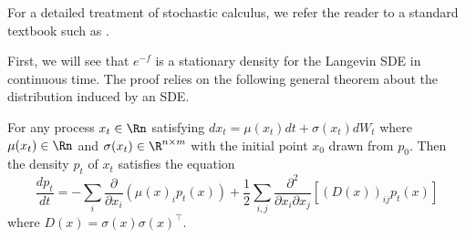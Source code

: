 For a detailed treatment of stochastic calculus, we refer the reader
to a standard textbook such as \cite{oksendal2013stochastic}. 

First, we will see that $e^{-f}$ is a stationary density for the
Langevin SDE in continuous time. The proof relies on the following
general theorem about the distribution induced by an SDE.
\begin{thm}
\label{thm:fokker_planck}For any process $x_{t}\in\Rn$ satisfying
$dx_{t}=\mu(x_{t})dt+\sigma(x_{t})dW_{t}$ where $\mu(x_{t})\in\Rn$
and $\sigma(x_{t})\in\R^{n\times m}$ with the initial point $x_{0}$
drawn from $p_{0}$. Then the density $p_{t}$ of $x_{t}$ satisfies
the equation
\[
\frac{dp_{t}}{dt}=-\sum_{i}\frac{\partial}{\partial x_{i}}(\mu(x)_{i}p_{t}(x))+\frac{1}{2}\sum_{i,j}\frac{\partial^{2}}{\partial x_{i}\partial x_{j}}\left[(D(x))_{ij}p_{t}(x)\right]
\]
where $D(x)=\sigma(x)\sigma(x)^{\top}$.
\end{thm}


